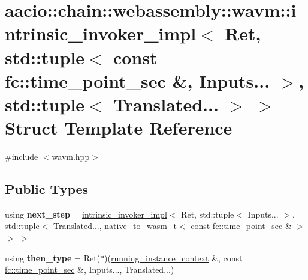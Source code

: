 \hypertarget{structaacio_1_1chain_1_1webassembly_1_1wavm_1_1intrinsic__invoker__impl_3_01_ret_00_01std_1_1tupe6f57535d094413488c9390cb89311e5}{}\section{aacio\+:\+:chain\+:\+:webassembly\+:\+:wavm\+:\+:intrinsic\+\_\+invoker\+\_\+impl$<$ Ret, std\+:\+:tuple$<$ const fc\+:\+:time\+\_\+point\+\_\+sec \&, Inputs... $>$, std\+:\+:tuple$<$ Translated... $>$ $>$ Struct Template Reference}
\label{structaacio_1_1chain_1_1webassembly_1_1wavm_1_1intrinsic__invoker__impl_3_01_ret_00_01std_1_1tupe6f57535d094413488c9390cb89311e5}


{\ttfamily \#include $<$wavm.\+hpp$>$}

\subsection*{Public Types}
\begin{DoxyCompactItemize}
\item 
\mbox{\label{structaacio_1_1chain_1_1webassembly_1_1wavm_1_1intrinsic__invoker__impl_3_01_ret_00_01std_1_1tupe6f57535d094413488c9390cb89311e5_ae7369b653ff303f08870f849375354d6}} 
using {\bfseries next\+\_\+step} = \mbox{\hyperlink{structaacio_1_1chain_1_1webassembly_1_1wavm_1_1intrinsic__invoker__impl}{intrinsic\+\_\+invoker\+\_\+impl}}$<$ Ret, std\+::tuple$<$ Inputs... $>$, std\+::tuple$<$ Translated..., native\+\_\+to\+\_\+wasm\+\_\+t$<$ const \mbox{\hyperlink{classfc_1_1time__point__sec}{fc\+::time\+\_\+point\+\_\+sec}} \& $>$ $>$ $>$
\item 
\mbox{\label{structaacio_1_1chain_1_1webassembly_1_1wavm_1_1intrinsic__invoker__impl_3_01_ret_00_01std_1_1tupe6f57535d094413488c9390cb89311e5_ae9796a6c9b69f0587cd0950e331b4ddf}} 
using {\bfseries then\+\_\+type} = Ret($\ast$)(\mbox{\hyperlink{structaacio_1_1chain_1_1webassembly_1_1wavm_1_1running__instance__context}{running\+\_\+instance\+\_\+context}} \&, const \mbox{\hyperlink{classfc_1_1time__point__sec}{fc\+::time\+\_\+point\+\_\+sec}} \&, Inputs..., Translated...)
\end{DoxyCompactItemize}
